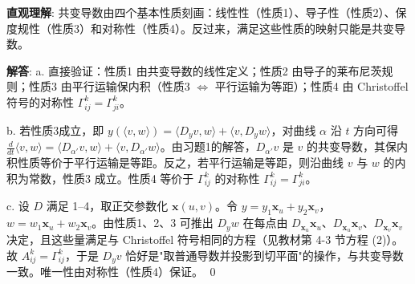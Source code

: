 \begin{solution}
\textbf{直观理解}: 共变导数由四个基本性质刻画：线性性（性质1）、导子性（性质2）、保度规性（性质3）和对称性（性质4）。反过来，满足这些性质的映射只能是共变导数。

\textbf{解答}: a. 直接验证：性质1 由共变导数的线性定义；性质2 由导子的莱布尼茨规则；性质3 由平行运输保内积（性质3 $\Leftrightarrow$ 平行运输为等距）；性质4 由 Christoffel 符号的对称性 $\Gamma_{ij}^k = \Gamma_{ji}^k$。

b. 若性质3成立，即 $y(\langle v,w\rangle) = \langle D_yv,w\rangle + \langle v,D_yw\rangle$，对曲线 $\alpha$ 沿 $t$ 方向可得 $\frac{d}{dt}\langle v,w\rangle = \langle D_{\alpha'}v,w\rangle + \langle v,D_{\alpha'}w\rangle$。由习题1的解答，$D_{\alpha'}v$ 是 $v$ 的共变导数，其保内积性质等价于平行运输是等距。反之，若平行运输是等距，则沿曲线 $v$ 与 $w$ 的内积为常数，性质3 成立。性质4 等价于 $\Gamma_{ij}^k$ 的对称性 $\Gamma_{ij}^k = \Gamma_{ji}^k$。

c. 设 $D$ 满足 1--4，取正交参数化 $\mathbf{x}(u,v)$。令 $y = y_1\mathbf{x}_u+y_2\mathbf{x}_v$，$w = w_1\mathbf{x}_u+w_2\mathbf{x}_v$。由性质1、2、3 可推出 $D_yw$ 在每点由 $D_{\mathbf{x}_u}\mathbf{x}_u$、$D_{\mathbf{x}_u}\mathbf{x}_v$、$D_{\mathbf{x}_v}\mathbf{x}_v$ 决定，且这些量满足与 Christoffel 符号相同的方程（见教材第 4-3 节方程 (2)）。故 $A_{ij}^k = \Gamma_{ij}^k$，于是 $D_yv$ 恰好是"取普通导数并投影到切平面"的操作，与共变导数一致。唯一性由对称性（性质4）保证。
\qed
\end{solution}


